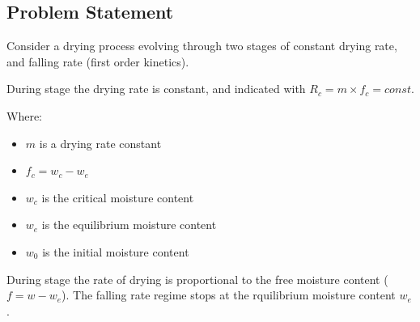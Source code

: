 \documentclass[letterpaper,10pt,english]{jupyterBook}
\begin{document}
\subsection{Problem Statement}
\label{\detokenize{Exercise_W10_2021:problem-statement}}
\sphinxAtStartPar
Consider a drying process evolving through two stages of  constant drying rate, and  falling rate (first order kinetics).

\sphinxAtStartPar
During stage  the drying rate  is constant, and indicated with \(R_c=m\times{f_c}=const\).

\sphinxAtStartPar
Where:
\begin{itemize}
\item {} 
\sphinxAtStartPar
\(m\) is a drying rate constant

\item {} 
\sphinxAtStartPar
\(f_c=w_c-w_e\)

\item {} 
\sphinxAtStartPar
\(w_c\) is the critical moisture content

\item {} 
\sphinxAtStartPar
\(w_e\) is the equilibrium moisture content

\item {} 
\sphinxAtStartPar
\(w_0\) is the initial moisture content

\end{itemize}

\sphinxAtStartPar
During stage  the rate of drying is proportional to the free moisture content (\(f=w-w_e\)). The falling rate regime stops at the rquilibrium moisture content \(w_e\).
\end{document}
